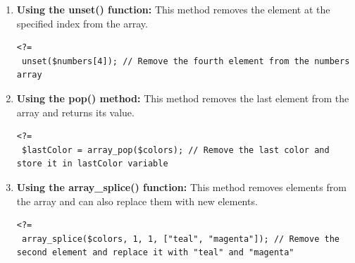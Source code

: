 \documentclass[11pt]{article}
\begin{document}
\begin{enumerate}
\item \textbf{Using the unset() function:} This method removes the element at the
specified index from the array.
\begin{verbatim}
<?=
 unset($numbers[4]); // Remove the fourth element from the numbers array
\end{verbatim}

\item \textbf{Using the pop() method:} This method removes the last element from
the array and returns its value.
\begin{verbatim}
<?=
 $lastColor = array_pop($colors); // Remove the last color and store it in lastColor variable
\end{verbatim}

\item \textbf{Using the array\_splice() function:} This method removes elements
from the array and can also replace them with new elements.
\begin{verbatim}
<?=
 array_splice($colors, 1, 1, ["teal", "magenta"]); // Remove the second element and replace it with "teal" and "magenta"
\end{verbatim}
\end{enumerate}
\end{document}

